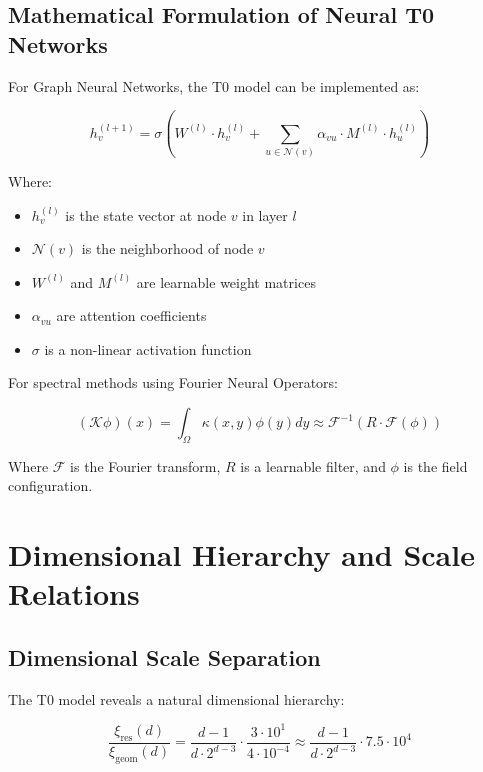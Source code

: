 \documentclass[12pt,a4paper]{article}
\newcommand{\xipar}{\ensuremath{\xi}}
\begin{document}
	\subsection{Mathematical Formulation of Neural T0 Networks}
	\label{subsec:mathematical_neural}
	
	For Graph Neural Networks, the T0 model can be implemented as:
	
	\begin{equation}
		h_v^{(l+1)} = \sigma\left(W^{(l)} \cdot h_v^{(l)} + \sum_{u \in \mathcal{N}(v)} \alpha_{vu} \cdot M^{(l)} \cdot h_u^{(l)}\right)
	\end{equation}
	
	Where:
	\begin{itemize}
		\item $h_v^{(l)}$ is the state vector at node $v$ in layer $l$
		\item $\mathcal{N}(v)$ is the neighborhood of node $v$
		\item $W^{(l)}$ and $M^{(l)}$ are learnable weight matrices
		\item $\alpha_{vu}$ are attention coefficients
		\item $\sigma$ is a non-linear activation function
	\end{itemize}
	
	For spectral methods using Fourier Neural Operators:
	
	\begin{equation}
		(\mathcal{K}\phi)(x) = \int_{\Omega} \kappa(x,y) \phi(y) dy \approx \mathcal{F}^{-1}(R \cdot \mathcal{F}(\phi))
	\end{equation}
	
	Where $\mathcal{F}$ is the Fourier transform, $R$ is a learnable filter, and $\phi$ is the field configuration.
	
	\section{Dimensional Hierarchy and Scale Relations}
	\label{sec:dimensional_hierarchy}
	
	\subsection{Dimensional Scale Separation}
	\label{subsec:scale_separation}
	
	The T0 model reveals a natural dimensional hierarchy:
	
	\begin{equation}
		\frac{\xipar_{\text{res}}(d)}{\xipar_{\text{geom}}(d)} = \frac{d-1}{d \cdot 2^{d-3}} \cdot \frac{3 \cdot 10^1}{4 \cdot 10^{-4}} \approx \frac{d-1}{d \cdot 2^{d-3}} \cdot 7.5 \cdot 10^4
	\end{equation}
	
\end{document}
